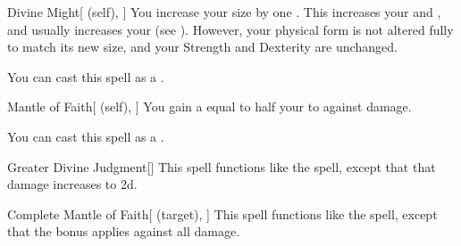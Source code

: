 \lowercase{\hypertarget{spell:Divine Might}{}}\label{spell:Divine Might}
\begin{attuneability}[Rank 4]{\hypertarget{spell:Divine Might}{Divine Might}}[ (self), ]
You increase your size by one .
This increases your  and , and usually increases your  (see ).
However, your physical form is not altered fully to match its new size, and your Strength and Dexterity are unchanged.

You can cast this spell as a .
\end{attuneability}
\vspace{0.25em}



\lowercase{\hypertarget{spell:Mantle of Faith}{}}\label{spell:Mantle of Faith}
\begin{attuneability}[Rank 4]{\hypertarget{spell:Mantle of Faith}{Mantle of Faith}}[ (self), ]
You gain a  equal to half your  to  against  damage.

You can cast this spell as a .
\end{attuneability}
\vspace{0.25em}



\lowercase{\hypertarget{spell:Greater Divine Judgment}{}}\label{spell:Greater Divine Judgment}
\begin{freeability}[Rank 5]{\hypertarget{spell:Greater Divine Judgment}{Greater Divine Judgment}}[]
This spell functions like the  spell, except that that damage increases to  \plus2d.
\end{freeability}
\vspace{0.25em}



\lowercase{\hypertarget{spell:Complete Mantle of Faith}{}}\label{spell:Complete Mantle of Faith}
\begin{attuneability}[Rank 6]{\hypertarget{spell:Complete Mantle of Faith}{Complete Mantle of Faith}}[ (target), ]
This spell functions like the  spell, except that the bonus applies against all damage.
\end{attuneability}
\vspace{0.25em}



